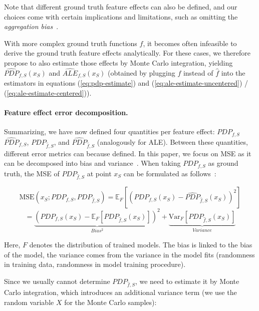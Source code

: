 \documentclass[runningheads]{llncs}
\begin{document}
\noindent Note that different ground truth feature effects can also be defined, and our choices
come with certain implications and limitations, such as omitting the
\textit{aggregation bias}~\cite{herbinger_repid_2022,mehrabi_survey_2021}.

With more complex ground truth functions $f$, it becomes often infeasible to
derive the ground truth feature effects analytically. For these cases, we
therefore propose to also estimate those effects by  %
Monte Carlo integration, yielding $\widehat{PDP}_{f,S}(x_S)$ and
$\widehat{ALE}_{f,S}(x_S)$ (obtained by plugging $f$ instead of $\hat f$
into the estimators in equations (\ref{eq:pdp-estimate}) and
(\ref{eq:ale-estimate-uncentered}) / (\ref{eq:ale-estimate-centered})).

\paragraph{Feature effect error decomposition.} Summarizing, we have now defined four quantities per feature effect:
$PDP_{f,S}$ $\widehat{PDP}_{f,S}$, $PDP_{\hat f,S}$, and $\widehat{PDP}_{\hat f,S}$
(analogously for ALE). Between these quantities, different error metrics can because
defined. In this paper, we focus on MSE as it can be decomposed into
bias and variance~\cite{geman_neural_1992}.
When taking $PDP_{f,S}$ as ground truth, the MSE of $PDP_{\hat f,S}$ at
point $x_S$ can be formulated as follows~\cite{molnar_relating_2023}:

\begin{equation}
    \text{MSE}(x_S; PDP_{f,S}, PDP_{\hat f,S})
    = \mathbb{E}_F[{(PDP_{f,S}(x_S) - \widehat{PDP}_{\hat f,S}(x_S))}^2]
\end{equation}
\begin{equation}
    = \underbrace{{(PDP_{f,S}(x_S) - \mathbb{E}_F[PDP_{\hat{f},S}(x_S)])}^2}_{Bias^2} + \underbrace{\text{Var}_F[PDP_{\hat{f},S}(x_S)]}_{Variance}
\end{equation}

\noindent Here, $F$ denotes the distribution of trained models. The bias
is linked to the bias of the model, the variance comes from the variance
in the model fits (randomness in training data, randomness in model training procedure).

Since we usually cannot determine $PDP_{\hat f,S}$, we need to estimate it by
Monte Carlo integration, which introduces an additional variance term (we use the random variable
$X$ for the Monte Carlo samples):
\end{document}
